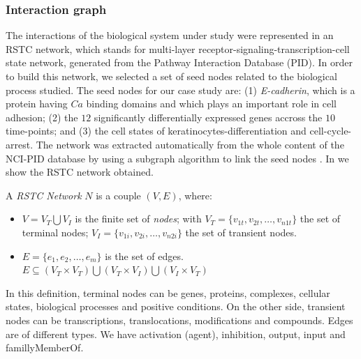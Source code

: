 \subsubsection{Interaction graph}
\label{ssec:RSTC}
The interactions of the biological system under study were represented in
 an RSTC network, which stands for  multi-layer receptor-signaling-transcription-cell state network, generated from the Pathway Interaction Database (PID).
In order to build this network, we selected a set of seed nodes related to the biological process studied.
The seed nodes for our case study are:  (1) \emph{E-cadherin}, which is a protein having $Ca$ binding domains and which plays an important role in cell adhesion;
(2) the $12$ significantly differentially expressed genes accross the $10$ time-points; and (3) the cell states of keratinocytes-differentiation and cell-cycle-arrest. 
The network was extracted automatically from the whole content of the NCI-PID database by using a subgraph algorithm to link the seed nodes \cite{guziolowski2012automatic}. 
In  we show the RSTC network obtained. 

\begin{definition} \label{def:RSTCDef}
A \emph{RSTC Network} $N$ is a couple $(V,E)$, where:
\begin{itemize}
\item $V =V_{T} \bigcup V_{I} $ is the finite set of \emph{nodes};
 with 
  $V_{T} = \{v_{1t},v_{2t}, \dots ,v_{n1t} \} $ the set of terminal nodes;
  $V_{I} = \{v_{1i},v_{2i}, \dots ,v_{n2i} \} $ the set of transient nodes.
\item $E = \{e_{1},e_{2}, \dots, e_{m} \}$ is the set of edges. $ E \subseteq (V_{T} \times V_{T}) \bigcup (V_{T} \times V_{I}) 
\bigcup (V_{I} \times V_{T})$
\end{itemize}
\end{definition}

In this definition, terminal nodes can be genes, proteins, complexes, cellular states, biological processes and positive conditions. 
On the other side, transient nodes can be transcriptions, translocations, modifications and compounds. Edges are of different types.
We have activation (agent), inhibition, output, input and famillyMemberOf.

